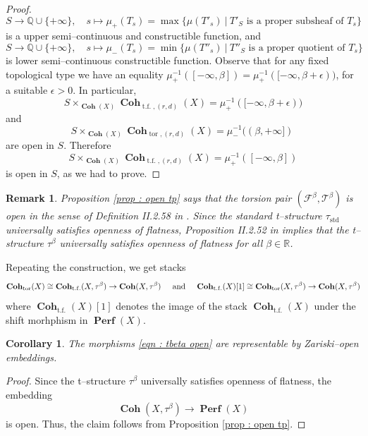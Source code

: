 \documentclass[11pt]{article}
\newtheorem{corollary}[theorem]{Corollary}
\newtheorem{remark}[theorem]{Remark}
\newcommand{\BR}{\mathbb{R}}
\newcommand{\BQ}{\mathbb{Q}}
\newcommand{\fbeta}{\mathcal{F}^{\beta}}
\newcommand{\tbeta}{\mathcal{T}^{\beta}}
\newcommand{\fbetastack}{\boldsymbol{\operatorname{Coh}}_{\operatorname{t.f.}}(X)}
\newcommand{\tbetastack}{\boldsymbol{\operatorname{Coh}}_{\operatorname{tor}}(X)}
\newcommand{\abetatorstack}{\boldsymbol{\operatorname{Coh}}_{\operatorname{tor}}(X,\tau^{\beta})}
\newcommand{\abetatfstack}{\boldsymbol{\operatorname{Coh}}_{\operatorname{t.f.}}(X,\tau^{\beta})}
\newcommand{\perfstack}{\boldsymbol{\operatorname{Perf}}(X)}
\newcommand{\cohflat}{\boldsymbol{\operatorname{Coh}}}
\begin{document}
\begin{proof}
\begin{equation}\label{eqn : mu+}
     S \longrightarrow \BQ \cup \{+\infty\}, \quad
    	 s \mapsto \mu_+(T_s) =\max\{ \mu(T'_s) \ \Big|\  T'_S \text{ is a proper subsheaf of } T_s \}
\end{equation}
is a upper semi--continuous and constructible function, and 
\begin{equation}\label{eqn : mu-}
  S \longrightarrow \BQ \cup \{+\infty\}, \quad
    	 s \mapsto \mu_-(T_s) =\min\{ \mu(T''_s) \ \Big|\  T''_S \text{ is a proper quotient of } T_s \}  
\end{equation}
is lower semi--continuous constructible function. Observe that for any fixed topological type we have an equality $\mu_+^{-1}([-\infty , \beta]) = \mu_+^{-1}([-\infty , \beta + \epsilon))$, for a suitable $\epsilon > 0$. In particular,
\[
    S\times_{\cohflat(X)} \cohflat_{\operatorname{t.f.}, (r,d)}(X)=  \mu_+^{-1}([-\infty, \beta + \epsilon)) 
\]
and
\[
    S\times_{\cohflat(X)} \cohflat_{\operatorname{tor}, (r,d)}(X) = \mu_-^{-1}((\beta,+\infty])  \ 
\]
are open in $S$. Therefore 
\[
    S\times_{\cohflat(X)} \cohflat_{\operatorname{t.f.}, (r,d)}(X) = \mu_+^{-1}([-\infty, \beta]) 
\]
is open in $S$, as we had to prove. 

\end{proof}


\begin{remark}\label{rmk : openness of flatness}
    Proposition \ref{prop : open tp} says that the torsion pair $(\fbeta, \tbeta)$ is open in the sense of Definition II.2.58 in \cite{dps}. Since the standard t--structure $\tau_{\operatorname{std}}$ universally satisfies openness of flatness, Proposition II.2.52 in \cite{dps} implies that the t--structure $\tau^\beta$ universally satisfies openness of flatness for all $\beta \in \BR$.
\end{remark}

\noindent Repeating the construction, we get stacks
\begin{equation}\label{eqn : tbeta open}
   \tbetastack\cong \abetatfstack\rightarrow \cohflat(X,\tau^\beta) \hspace{0.5cm} \text{and} \hspace{0.5cm}  \fbetastack[1] \cong \abetatorstack\rightarrow \cohflat(X,\tau^\beta)
\end{equation}
where $\fbetastack[1]$ denotes the image of the stack $\fbetastack$ under the shift morhphism in $\perfstack$. 

\begin{corollary}
     The morphisms \eqref{eqn : tbeta open} are representable by Zariski--open embeddings.
\end{corollary}
\begin{proof}
    Since the t--structure $\tau^\beta$ universally satisfies openness of flatness, the embedding
    \[
        \cohflat(X,\tau^\beta) \longrightarrow \perfstack
    \]
    is open. Thus, the claim follows from Proposition \ref{prop : open tp}.
\end{proof}
\end{document}
